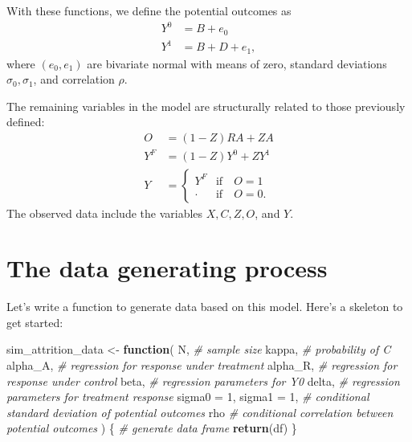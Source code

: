 \documentclass[
]{book}
\newenvironment{Shaded}{\begin{snugshade}}{\end{snugshade}}
\newcommand{\AttributeTok}[1]{\textcolor[rgb]{0.13,0.29,0.53}{#1}}
\newcommand{\CommentTok}[1]{\textcolor[rgb]{0.56,0.35,0.01}{\textit{#1}}}
\newcommand{\ControlFlowTok}[1]{\textcolor[rgb]{0.13,0.29,0.53}{\textbf{#1}}}
\newcommand{\DecValTok}[1]{\textcolor[rgb]{0.00,0.00,0.81}{#1}}
\newcommand{\FunctionTok}[1]{\textcolor[rgb]{0.13,0.29,0.53}{\textbf{#1}}}
\newcommand{\NormalTok}[1]{#1}
\newcommand{\OtherTok}[1]{\textcolor[rgb]{0.56,0.35,0.01}{#1}}
\begin{document}
With these functions, we define the potential outcomes as
\[
\begin{aligned}
Y^0 &= B + e_0 \\
Y^1 &= B + D + e_1,
\end{aligned}
\]
where \((e_0, e_1)\) are bivariate normal with means of zero, standard deviations \(\sigma_0, \sigma_1\), and correlation \(\rho\).

The remaining variables in the model are structurally related to those previously defined:
\[
\begin{aligned}
O &= (1 - Z) R A + Z A \\
Y^F &= (1 - Z) Y^0 + Z Y^1 \\
Y &= \begin{cases} Y^F & \text{if} \quad O = 1 \\ 
\cdot & \text{if} \quad O = 0. \end{cases}
\end{aligned}
\]
The observed data include the variables \(X, C, Z, O\), and \(Y\).

\section{The data generating process}\label{the-data-generating-process}

Let's write a function to generate data based on this model. Here's a skeleton to get started:

\begin{Shaded}
\begin{Highlighting}[]
\NormalTok{sim\_attrition\_data }\OtherTok{\textless{}{-}} \ControlFlowTok{function}\NormalTok{(}
\NormalTok{    N,                      }\CommentTok{\# sample size}
\NormalTok{    kappa,                  }\CommentTok{\# probability of C}
\NormalTok{    alpha\_A,                }\CommentTok{\# regression for response under treatment}
\NormalTok{    alpha\_R,                }\CommentTok{\# regression for response under control}
\NormalTok{    beta,                   }\CommentTok{\# regression parameters for Y0}
\NormalTok{    delta,                  }\CommentTok{\# regression parameters for treatment response}
    \AttributeTok{sigma0 =} \DecValTok{1}\NormalTok{, }\AttributeTok{sigma1 =} \DecValTok{1}\NormalTok{, }\CommentTok{\# conditional standard deviation of potential outcomes}
\NormalTok{    rho                     }\CommentTok{\# conditional correlation between potential outcomes}
\NormalTok{) \{}
  \CommentTok{\# generate data frame}
  \FunctionTok{return}\NormalTok{(df)}
\NormalTok{\}}
\end{Highlighting}
\end{Shaded}
\end{document}

